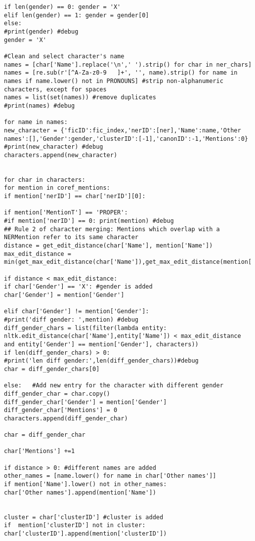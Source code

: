 \documentclass{pre-tfg}
\begin{document}
\begin{lstlisting}[style=consola]
if len(gender) == 0: gender = 'X'
elif len(gender) == 1: gender = gender[0]
else:
#print(gender) #debug
gender = 'X'

#Clean and select character's name
names = [char['Name'].replace('\n',' ').strip() for char in ner_chars]
names = [re.sub(r'[^A-Za-z0-9 	]+', '', name).strip() for name in names if name.lower() not in PRONOUNS] #strip non-alphanumeric characters, except for spaces
names = list(set(names)) #remove duplicates
#print(names) #debug

for name in names:
new_character = {'ficID':fic_index,'nerID':[ner],'Name':name,'Other names':[],'Gender':gender,'clusterID':[-1],'canonID':-1,'Mentions':0}
#print(new_character) #debug
characters.append(new_character)


for char in characters:
for mention in coref_mentions:
if mention['nerID'] == char['nerID'][0]:

if mention['MentionT'] == 'PROPER':
#if mention['nerID'] == 0: print(mention) #debug
## Rule 2 of character merging: Mentions which overlap with a NERMention refer to its same character
distance = get_edit_distance(char['Name'], mention['Name'])
max_edit_distance = min(get_max_edit_distance(char['Name']),get_max_edit_distance(mention['Name']))

if distance < max_edit_distance:
if char['Gender'] == 'X': #gender is added
char['Gender'] = mention['Gender']

elif char['Gender'] != mention['Gender']: 
#print('diff gender: ',mention) #debug
diff_gender_chars = list(filter(lambda entity: nltk.edit_distance(char['Name'],entity['Name']) < max_edit_distance and entity['Gender'] == mention['Gender'], characters))
if len(diff_gender_chars) > 0:
#print('len diff gender:',len(diff_gender_chars))#debug
char = diff_gender_chars[0]

else:	#Add new entry for the character with different gender
diff_gender_char = char.copy()
diff_gender_char['Gender'] = mention['Gender']
diff_gender_char['Mentions'] = 0
characters.append(diff_gender_char)

char = diff_gender_char

char['Mentions'] +=1

if distance > 0: #different names are added
other_names = [name.lower() for name in char['Other names']]
if mention['Name'].lower() not in other_names:
char['Other names'].append(mention['Name'])


cluster = char['clusterID'] #cluster is added
if  mention['clusterID'] not in cluster: char['clusterID'].append(mention['clusterID'])



\end{lstlisting}
\end{document}
